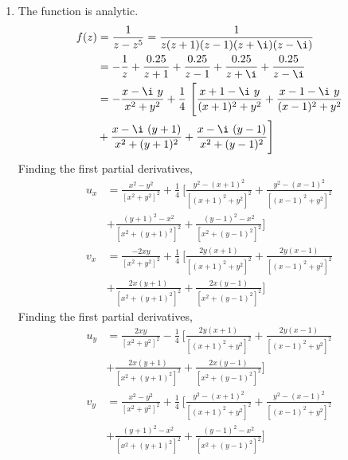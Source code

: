 \begin{enumerate}
    \item The function is \textcolor{y_h}{analytic}.
          \begin{align}
              f(z) & = \frac{1}{z - z^5} = \frac{1}{z(z+1)(z-1)(z+\i)(z-\i)}        \\
                   & = -\frac{1}{z} + \frac{0.25}{z+1} + \frac{0.25}{z-1}
              + \frac{0.25}{z + \i} + \frac{0.25}{z - \i}                           \\
                   & = -\frac{x - \i\ y}{x^2 + y^2} + \frac{1}{4}\ \Bigg[
              \frac{x+1 - \i\ y}{(x+1)^2 + y^2} + \frac{x-1 - \i\ y}{(x-1)^2 + y^2} \\
                   & + \frac{x - \i\ (y+1)}{x^2 + (y+1)^2}
                  + \frac{x - \i\ (y-1)}{x^2 + (y-1)^2}\Bigg]
          \end{align}
          Finding the first partial derivatives,
          \begin{align}
              u_x & = \frac{x^2 - y^2}{[x^2 + y^2]^2} + \frac{1}{4}\ \Bigg[
                  \frac{y^2 - (x+1)^2}{[(x+1)^2 + y^2]^2}
              + \frac{y^2 - (x-1)^2}{[(x-1)^2 + y^2]^2}                     \\
                  & + \frac{(y+1)^2 - x^2}{[x^2 + (y+1)^2]^2}
              + \frac{(y-1)^2 - x^2}{[x^2 + (y-1)^2]^2}\Bigg]               \\
              v_x & = \frac{-2xy}{[x^2 + y^2]^2} + \frac{1}{4}\ \Bigg[
                  \frac{2y(x+1)}{[(x+1)^2 + y^2]^2}
              + \frac{2y(x-1)}{[(x-1)^2 + y^2]^2}                           \\
                  & + \frac{2x(y+1)}{[x^2 + (y+1)^2]^2}
                  + \frac{2x(y-1)}{[x^2 + (y-1)^2]^2}\Bigg]
          \end{align}
          Finding the first partial derivatives,
          \begin{align}
              u_y & = \frac{2xy}{[x^2 + y^2]^2} - \frac{1}{4}\ \Bigg[
                  \frac{2y(x+1)}{[(x+1)^2 + y^2]^2}
              + \frac{2y(x-1)}{[(x-1)^2 + y^2]^2}                           \\
                  & + \frac{2x(y+1)}{[x^2 + (y+1)^2]^2}
              + \frac{2x(y-1)}{[x^2 + (y-1)^2]^2}\Bigg]                     \\
              v_y & = \frac{x^2 - y^2}{[x^2 + y^2]^2} + \frac{1}{4}\ \Bigg[
                  \frac{y^2 - (x+1)^2}{[(x+1)^2 + y^2]^2}
              + \frac{y^2 - (x-1)^2}{[(x-1)^2 + y^2]^2}                     \\
                  & + \frac{(y+1)^2 - x^2}{[x^2 + (y+1)^2]^2}
                  + \frac{(y-1)^2 - x^2}{[x^2 + (y-1)^2]^2}\Bigg]
          \end{align}


\end{enumerate}

